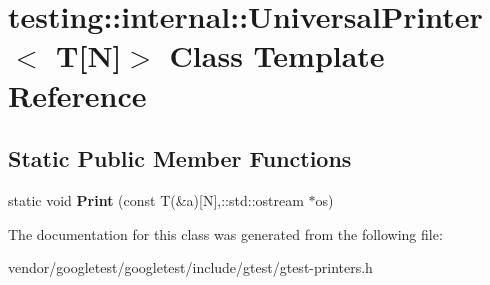 \hypertarget{classtesting_1_1internal_1_1UniversalPrinter_3_01T[N]_4}{}\section{testing\+:\+:internal\+:\+:Universal\+Printer$<$ T\mbox{[}N\mbox{]}$>$ Class Template Reference}
\label{classtesting_1_1internal_1_1UniversalPrinter_3_01T[N]_4}
\subsection*{Static Public Member Functions}
\begin{DoxyCompactItemize}
\item 
static void {\bfseries Print} (const T(\&a)\mbox{[}N\mbox{]},\+::std\+::ostream $\ast$os)\hypertarget{classtesting_1_1internal_1_1UniversalPrinter_3_01T[N]_4_a47e8cb5abce40735db381910513a4721}{}\label{classtesting_1_1internal_1_1UniversalPrinter_3_01T[N]_4_a47e8cb5abce40735db381910513a4721}

\end{DoxyCompactItemize}


The documentation for this class was generated from the following file\+:\begin{DoxyCompactItemize}
\item 
vendor/googletest/googletest/include/gtest/gtest-\/printers.\+h\end{DoxyCompactItemize}
